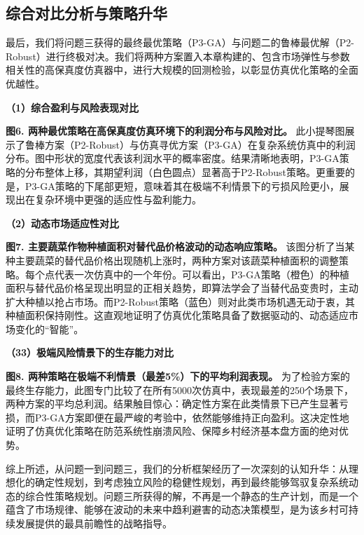 \documentclass[withoutpreface,bwprint]{cumcmthesis} %
\begin{document}
\subsection{综合对比分析与策略升华}

最后，我们将问题三获得的最终最优策略（P3-GA）与问题二的鲁棒最优解（P2-Robust）进行终极对决。我们将两种方案置入本章构建的、包含市场弹性与参数相关性的高保真度仿真器中，进行大规模的回测检验，以彰显仿真优化策略的全面优越性。

\textbf{（1）综合盈利与风险表现对比}

\textbf{图6. 两种最优策略在高保真度仿真环境下的利润分布与风险对比。} 此小提琴图展示了鲁棒方案（P2-Robust）与仿真寻优方案（P3-GA）在复杂系统仿真中的利润分布。图中形状的宽度代表该利润水平的概率密度。结果清晰地表明，P3-GA策略的分布整体上移，其期望利润（白色圆点）显著高于P2-Robust策略。更重要的是，P3-GA策略的下尾部更短，意味着其在极端不利情景下的亏损风险更小，展现出在复杂环境中更强的适应性与盈利能力。

\textbf{（2）动态市场适应性对比}

\textbf{图7. 主要蔬菜作物种植面积对替代品价格波动的动态响应策略。} 该图分析了当某种主要蔬菜的替代品价格出现随机上涨时，两种方案对该蔬菜种植面积的调整策略。每个点代表一次仿真中的一个年份。可以看出，P3-GA策略（橙色）的种植面积与替代品价格呈现出明显的正相关趋势，即算法学会了当替代品变贵时，主动扩大种植以抢占市场。而P2-Robust策略（蓝色）则对此类市场机遇无动于衷，其种植面积保持刚性。这直观地证明了仿真优化策略具备了数据驱动的、动态适应市场变化的“智能”。

\textbf{（33）极端风险情景下的生存能力对比}

\textbf{图8. 两种策略在极端不利情景（最差5\%）下的平均利润表现。} 为了检验方案的最终生存能力，此图专门比较了在所有5000次仿真中，表现最差的250个场景下，两种方案的平均总利润。结果触目惊心：确定性方案在此类情景下已产生显著亏损，而P3-GA方案即便在最严峻的考验中，依然能够维持正向盈利。这决定性地证明了仿真优化策略在防范系统性崩溃风险、保障乡村经济基本盘方面的绝对优势。

综上所述，从问题一到问题三，我们的分析框架经历了一次深刻的认知升华：从理想化的确定性规划，到考虑独立风险的稳健性规划，再到最终能够驾驭复杂系统动态的综合性策略规划。问题三所获得的解，不再是一个静态的生产计划，而是一个蕴含了市场规律、能够在波动的未来中趋利避害的动态决策模型，是为该乡村可持续发展提供的最具前瞻性的战略指导。

\newpage



\newpage
\end{document}
